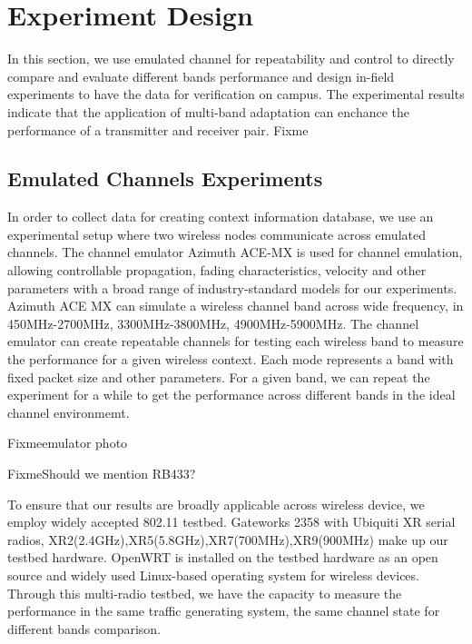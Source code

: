 \section{Experiment Design}
\label{sec:experiment design}



In this section, we use emulated channel for repeatability and control to directly compare and evaluate different bands performance and design in-field experiments to have the data for verification on campus. The experimental results indicate that the application of multi-band adaptation can enchance the performance of a transmitter and receiver pair. 
Fixme%

\subsection{Emulated Channels Experiments}
In order to collect data for creating context information database, we use an experimental setup where two wireless nodes communicate across emulated channels. The channel emulator Azimuth ACE-MX is used for channel emulation, allowing controllable propagation, fading characteristics, velocity and other parameters with a broad range of industry-standard models for our experiments\cite{AzimuthACE}. Azimuth ACE MX can simulate a wireless channel band across wide frequency, in 450MHz-2700MHz, 3300MHz-3800MHz, 4900MHz-5900MHz\cite{AzimuthACE}. The channel emulator can create repeatable channels for testing each wireless band to measure the performance for a given wireless context. Each mode represents a band with fixed packet size and other parameters. For a given band, we can repeat the experiment for a while to get the performance across different bands in the ideal channel environmemt.

Fixme{emulator photo}

Fixme{Should we mention RB433?}

To ensure that our results are broadly applicable across wireless device, we employ widely accepted 802.11 testbed. Gateworks 2358 with Ubiquiti XR serial radios, XR2(2.4GHz),XR5(5.8GHz),XR7(700MHz),XR9(900MHz) make up our testbed hardware\cite{Gateworks,Ubnt}. OpenWRT is installed on the testbed hardware as an open source and widely used Linux-based operating system for wireless devices\cite{Openwrt}. Through this multi-radio testbed, we have the capacity to measure the performance in the same traffic generating system, the same channel state for different bands comparison.

